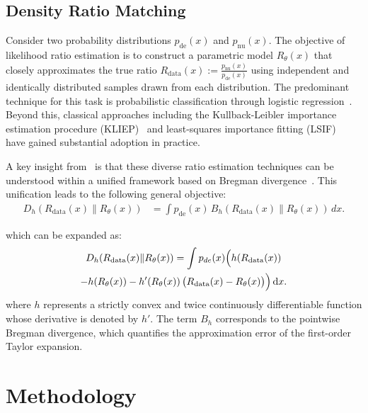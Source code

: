 \documentclass{article}
\theoremstyle{plain}
\theoremstyle{definition}
\theoremstyle{remark}
\begin{document}
\subsection{Density Ratio Matching}
\label{sec:density_matching}
Consider two probability distributions $p_{\text{de}}(x)$ and $p_{\text{nu}}(x)$. The objective of likelihood ratio estimation is to construct a parametric model $R_\theta(x)$ that closely approximates the true ratio $R_{\text{data}}(x) := \frac{p_{\text{nu}}(x)}{p_{\text{de}}(x)}$ using independent and identically distributed samples drawn from each distribution. The predominant technique for this task is probabilistic classification through logistic regression~\cite{JMLR:v13:gutmann12a}. Beyond this, classical approaches including the Kullback-Leibler importance estimation procedure (KLIEP)~\cite{NIPS2007_be83ab3e} and least-squares importance fitting (LSIF)~\cite{lsif} have gained substantial adoption in practice.

A key insight from~\cite{Sugiyama2012DensityRatioMatching} is that these diverse ratio estimation techniques can be understood within a unified framework based on Bregman divergence~\cite{Bregman1967TheRM}. This unification leads to the following general objective:
\begin{equation*}
\begin{split}
D_h\!\left(R_{\text{data}}(x)\|R_\theta(x)\right)
&= \int p_{\text{de}}(x)\,
B_h\!\left(R_{\text{data}}(x)\|R_\theta(x)\right)\,dx .
\end{split}
\end{equation*}

which can be expanded as:
\begin{multline}
D_h\!\left(R_{\text{data}}(x)\|R_\theta(x)\right)
= \int p_{de}(x)\Bigl(
    h\!\left(R_{\text{data}}(x)\right)\\
  - h\!\left(R_{\theta}(x)\right) 
  - h'\!\left(R_{\theta}(x)\right)\bigl(R_{\text{data}}(x)-R_{\theta}(x)\bigr)
\Bigr)\,\mathrm{d}x .
\end{multline}
where $h$ represents a strictly convex and twice continuously differentiable function whose derivative is denoted by $h'$. The term $B_h$ corresponds to the pointwise Bregman divergence, which quantifies the approximation error of the first-order Taylor expansion. 


\section{Methodology}
\label{sec:method}
\end{document}
